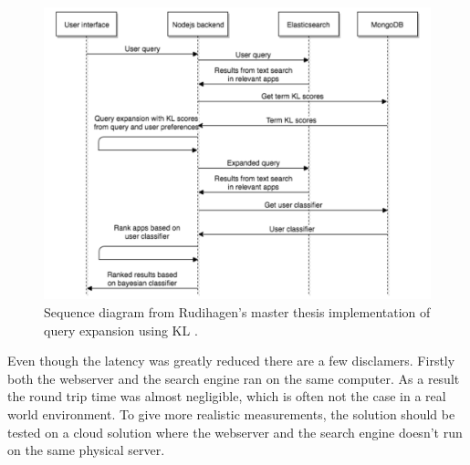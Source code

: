 \begin{figure}[h!]
\centering \includegraphics[width=0.9\linewidth]{img/sequence-diagram-search-master-thesis.png}
\caption{Sequence diagram from Rudihagen's master thesis implementation of query expansion using KL \cite[p. 37]{master-thesis}.}
\label{fig:sequence-diagram-search-master}
\end{figure}

Even though the latency was greatly reduced there are a few disclamers.
Firstly both the webserver and the search engine ran on the same computer.
As a result the round trip time was almost negligible, which is often not the case in a real world environment.
To give more realistic measurements, the solution should be tested on a cloud solution where the webserver and the search engine doesn't run on the same physical server.
